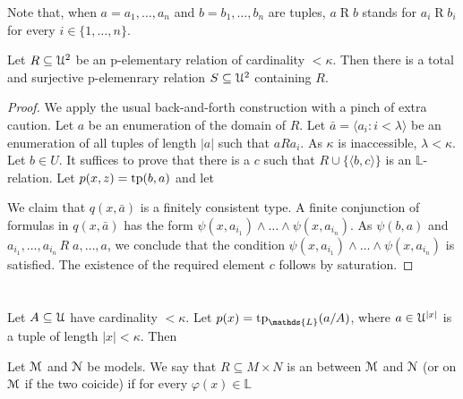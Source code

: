 \documentclass[10pt,oneside]{amsproc}
\renewcommand*{\emph}[1]{%
   \smash{\tikz[baseline]\node[rectangle, fill=teal!25, rounded corners, inner xsep=0.5ex, inner ysep=0.2ex, anchor=base, minimum height = 2.7ex]{\strut #1};}}
\begin{document}
{Note that, when $a=a_1,\dots,a_n$ and $b=b_1,\dots,b_n$ are tuples, $a\mathbin{R}b$ stands for $a_i\mathbin{R}b_i$ for every $i\in\{1,\dots,n\}$.

\begin{fact}
  Let $R\subseteq{\EuScript U}^2$ be an p-elementary relation of cardinality $<\kappa$.
  Then there is a total and surjective p-elemenrary relation $S\subseteq{\EuScript U}^2$ containing $R$.
\end{fact}

\begin{proof}
  We apply the usual back-and-forth construction with a pinch of extra caution.
  Let $a$ be an enumeration of the domain of $R$.
  Let $\bar a=\langle a_i:i<\lambda\rangle$ be an enumeration of all tuples of length $|a|$ such that $aRa_i$.
  As $\kappa$ is inaccessible, $\lambda<\kappa$.
  Let $b\in U$.
  It suffices to prove that there is a $c$ such that $R\cup\{\langle b,c\rangle\}$ is an $\mathds{L}$-relation.
  Let $p(x,z)={\rm tp}(b,a)$ and let
  

  We claim that $q(x,\bar a)$ is a finitely consistent type.
  A finite conjunction of formulas in $q(x,\bar a)$ has the form $\psi(x,a_{i_1})\wedge\dots\wedge\psi(x,a_{i_n})$.
  As $\psi(b,a)$ and $a_{i_1},\dots,a_{i_n}\,R\;a,\dots,a$, we conclude that the condition $\psi(x,a_{i_1})\wedge\dots\wedge\psi(x,a_{i_n})$ is satisfied.
  The existence of the required element $c$ follows by saturation.
\end{proof}

\section{}

\begin{corollary}
  Let $A\subseteq{\EuScript U}$ have cardinality $<\kappa$.
  Let $p(x)={\rm tp}_\mathds{L}(a/A)$, where $a\in{\EuScript U}^{|x|}$ is a tuple of length $|x|<\kappa$.
  Then

\end{corollary}



Let ${\EuScript M}$ and ${\EuScript N}$ be models.
We say that $R\subseteq M\times N$ is an \emph{$\mathds{L}$-(elementary) relation\/} between ${\EuScript M}$ and ${\EuScript N}$ (or on ${\EuScript M}$ if the two coicide) if for every $\varphi(x)\in\mathds{L}$

}
\end{document}
